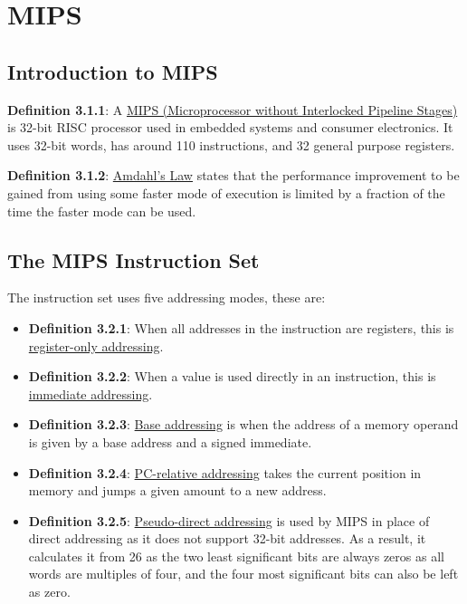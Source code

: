 \documentclass{article}
\newcommand{\separate}[1] {\vspace{#1 pt}\noindent}
\newcommand{\definition}[2]{\textbf{Definition #1}: #2\label{def:#1}}
\begin{document}
\section{MIPS}

\subsection{Introduction to MIPS}

\definition{3.1.1}{A \underline{MIPS (Microprocessor without Interlocked Pipeline Stages)} is 32-bit RISC processor used in embedded systems and consumer electronics. It uses 32-bit words, has around 110 instructions, and 32 general purpose registers.}

\separate{5}\definition{3.1.2}{\underline{Amdahl's Law} states that the performance improvement to be gained from using some faster mode of execution is limited by a fraction of the time the faster mode can be used.}

\subsection{The MIPS Instruction Set}

The instruction set uses five addressing modes, these are:
\begin{itemize}
    \item \definition{3.2.1}{When all addresses in the instruction are registers, this is \underline{register-only addressing}.}
    \item \definition{3.2.2}{When a value is used directly in an instruction, this is \underline{immediate addressing}.}
    \item \definition{3.2.3}{\underline{Base addressing} is when the address of a memory operand is given by a base address and a signed immediate.}
    \item \definition{3.2.4}{\underline{PC-relative addressing} takes the current position in memory and jumps a given amount to a new address.}
    \item \definition{3.2.5}{\underline{Pseudo-direct addressing} is used by MIPS in place of direct addressing as it does not support 32-bit addresses. As a result, it calculates it from 26 as the two least significant bits are always zeros as all words are multiples of four, and the four most significant bits can also be left as zero.}
\end{itemize}
\end{document}
